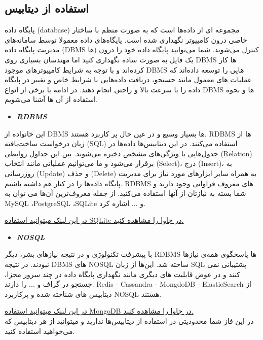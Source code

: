 \documentclass[]{article}
\begin{document}
\subsection*{{\titr استفاده از دیتابیس}}

پایگاه داده (database) مجموعه ای از داده‌ها است که به صورت منظم با ساختار خاصی درون کامپیوتر نگهداری شده است. پایگاه‌های داده معمولا توسط سامانه‌های مدیریت پایگاه داده (DBMS ها) کنترل می‌شوند. شما می‌توانید پایگاه داده خود را درون یک فایل به صورت ساده نگهداری کنید اما مهندسان بسیاری روی DBMS ها کار کرده‌اند و با توجه به شرایط کامپیوترهای موجود DBMS هایی را توسعه داده‌اند که عملیات های معمول مانند جستجو، دریافت داده‌هایی با شرایط خاص و تغییر در پایگاه داده را با سرعت بالا و راحتی انجام دهند. در ادامه با برخی از انواع DBMS ها و نحوه استفاده از آن ها آشنا می‌شویم.

\begin{itemize}
\item \textbf{\emph{ RDBMS }}
\end{itemize}

این خانواده از DBMS ها بسیار وسیع و در عین حال پر کاربرد هستند. RDBMS ها از زبان درخواست ساخت‌یافته (SQL) استفاده می‌کنند. در این دیتابیس‌ها داده‌ها در جدول‌هایی با ویژگی‌های مشخص ذخیره می‌شوند. بین این جداول روابطی (Relation) برقرار می‌شود و ما می‌توانیم عملیاتی مانند انتخاب (Select)، درج (Insert)، به روزرسانی (Update) و حذف (Delete) به همراه سایر ابزارهای مورد نیاز برای مدیریت پایگاه داده‌ها را در کنار هم داشته باشیم. RDBMS های معروف فراوانی وجود دارند و شما بسته به نیازتان از آنها استفاده می‌کنید. از جمله معروف‌ترین آن‌ها می توان به MySQL ،PostgreSQL ،SQLite و ... اشاره کرد.

\href{https://www.tutorialspoint.com/sqlite/sqlite_java.htm}{در این لینک میتوانید استفاده SQLite در جاوا را مشاهده کنید.}
\\

\begin{itemize}
\item \textbf{\emph{ NOSQL }}
\end{itemize}

با پیشرفت تکنولوژی و در نتیجه نیاز‌های بشر، دیگر RDBMS ها پاسخگوی همه‌ی نیازها نبودند. در نتیجه DBMS های NOSQL ساخته شد. این‌ها از زبان SQL پشتیبانی نمی کنند و در عوض قابلیت های دیگری مانند نگهداری پایگاه داده در چند سرور مجزا، جستجو در گراف و ... را دارند. Redis - Cassandra - MongdoDB - ElasticSearch  از دیتابیس های شناخته شده و پرکاربرد NOSQL هستند.

\href{https://www.tutorialspoint.com/mongodb/mongodb_java.htm}{در این لینک میتوانید استفاده MongoDB در جاوا را مشاهده کنید.}
\\

در این فاز شما محدودیتی در استفاده از دیتابیس‌ها ندارید و میتوانید از هر دیتابیس که می‌خواهید استفاده کنید.
\end{document}
